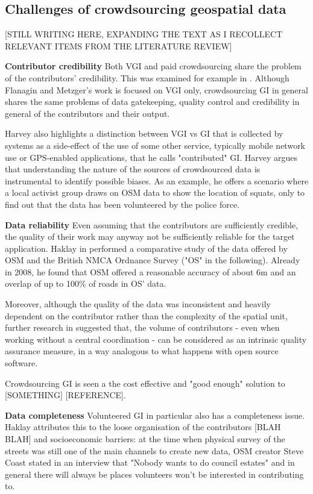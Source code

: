  \subsection{Challenges of crowdsourcing geospatial data}

[STILL WRITING HERE, EXPANDING THE TEXT AS I RECOLLECT RELEVANT ITEMS FROM THE LITERATURE REVIEW]

\textbf{Contributor credibility} Both VGI and paid crowdsourcing share the problem of the contributors' credibility. This was examined for example in \cite{Flanagin:2008ck}. Although Flanagin and Metzger's work is focused on VGI only, crowdsourcing GI in general shares the same problems of data gatekeeping, quality control and credibility in general of the contributors and their output. 

Harvey \cite{Harvey:2012wsa} also highlights a distinction between VGI vs GI that is collected by systems as a side-effect of the use of some other service, typically mobile network use or GPS-enabled applications, that he calls "contributed" GI. Harvey argues that understanding the nature of the sources of crowdsourced data is instrumental to identify possible biases. As an example, he offers a scenario where a local activist group draws on OSM data to show the location of squats, only to find out that the data has been volunteered by the police force. 

\textbf{Data reliability} Even assuming that the contributors are sufficiently credible, the quality of their work may anyway not be sufficiently reliable for the target application. Haklay in \cite{Haklay:2010vs} performed a comparative study of the data offered by OSM and the British NMCA Ordnance Survey ("OS" in the following). Already in 2008, he found that OSM offered a reasonable accuracy of about 6m and an overlap of up to 100\% of roads in OS' data. 

Moreover, although the quality of the data was inconsistent and heavily dependent on the contributor rather than the complexity of the spatial unit, further research in  \cite{Haklay:2010wf} suggested that, the volume of contributors - even when working without a central coordination - can be considered as an intrinsic quality assurance measure, in a way analogous to what happens with open source software.

Crowdsourcing GI is seen a the cost effective and "good enough" solution to [SOMETHING] [REFERENCE]. 

\textbf{Data completeness} Volunteered GI in particular also has a completeness issue. Haklay attributes this to the loose organisation of the contributors \cite{Haklay:2010vs} [BLAH BLAH] and socioeconomic barriers: at the time when physical survey of the streets was still one of the main channels to create new data, OSM creator Steve Coast stated in an interview that "Nobody wants to do council estates" \cite{Anonymous:2007ux} and in general there will always be places volunteers won't be interested in contributing to.

